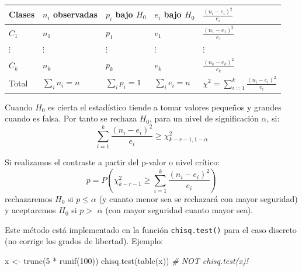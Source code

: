 \documentclass[
]{book}
\newenvironment{Shaded}{\begin{snugshade}}{\end{snugshade}}
\newcommand{\CommentTok}[1]{\textcolor[rgb]{0.56,0.35,0.01}{\textit{#1}}}
\newcommand{\DecValTok}[1]{\textcolor[rgb]{0.00,0.00,0.81}{#1}}
\newcommand{\FunctionTok}[1]{\textcolor[rgb]{0.00,0.00,0.00}{#1}}
\newcommand{\NormalTok}[1]{#1}
\newcommand{\OtherTok}[1]{\textcolor[rgb]{0.56,0.35,0.01}{#1}}
\newcommand{\SpecialCharTok}[1]{\textcolor[rgb]{0.00,0.00,0.00}{#1}}
\theoremstyle{break}
\theoremstyle{nonumberplain}
\begin{document}
\begin{longtable}[]{@{}
  >{\raggedright\arraybackslash}p{}
  >{\raggedright\arraybackslash}p{}
  >{\raggedright\arraybackslash}p{}
  >{\raggedright\arraybackslash}p{}
  >{\raggedright\arraybackslash}p{}@{}}
\toprule
Clases & \(n_{i}\) observadas & \(p_{i}\) bajo \(H_0\) & \(e_{i}\) bajo \(H_0\) & \(\frac{(n_{i}-e_{i})^2}{e_{i}}\) \\
\midrule
\endhead
\(C_1\) & \(n_1\) & \(p_1\) & \(e_1\) & \(\frac{(n_1-e_1)^2}{e_1}\) \\
\(\vdots\) & \(\vdots\) & \(\vdots\) & \(\vdots\) & \(\vdots\) \\
\(C_{k}\) & \(n_{k}\) & \(p_{k}\) & \(e_{k}\) & \(\frac{(n_{k}-e_{k})^2}{e_{k}}\) \\
Total & \(\sum_{i}n_{i}=n\) & \(\sum_{i}p_{i}=1\) & \(\sum_{i}e_{i}=n\) & \(\chi^2=\sum_{i=1}^{k}\frac{(n_{i}-e_{i})^2}{e_{i}}\) \\
\bottomrule
\end{longtable}

Cuando \(H_0\) es cierta el estadístico tiende a tomar valores pequeños y grandes cuando es falsa.
Por tanto se rechaza \(H_0\), para un nivel de significación \(\alpha\), si:
\[\sum_{i=1}^{k}\frac{(n_{i}-e_{i})^2}{e_{i}}\geq \chi_{k-r-1,1-\alpha}^2\]

Si realizamos el contraste a partir del p-valor o nivel crítico:
\[p=P\left(  {\chi_{k-r-1}^2\geq \sum \limits_{i=1}^{k}{\frac{(n_{i}-e_{i})^2}{e_{i}}}}\right)\]
rechazaremos \(H_0\) si \(p\leq \alpha\) (y cuanto menor sea se rechazará con mayor seguridad) y aceptaremos \(H_0\) si \(p>\) \(\alpha\) (con mayor seguridad cuanto mayor sea).

Este método está implementado en la función \texttt{chisq.test()} para el caso discreto (no corrige los grados de libertad).
Ejemplo:

\begin{Shaded}
\begin{Highlighting}[]
\NormalTok{x }\OtherTok{\textless{}{-}} \FunctionTok{trunc}\NormalTok{(}\DecValTok{5} \SpecialCharTok{*} \FunctionTok{runif}\NormalTok{(}\DecValTok{100}\NormalTok{))}
\FunctionTok{chisq.test}\NormalTok{(}\FunctionTok{table}\NormalTok{(x))            }\CommentTok{\# NOT \textquotesingle{}chisq.test(x)\textquotesingle{}!}
\end{Highlighting}
\end{Shaded}
\end{document}
